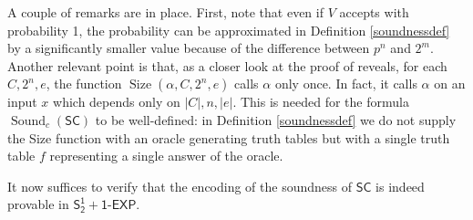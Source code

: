 \documentclass[11pt]{article}
\newcommand{\SOTEXP}{\mathsf{S^1_2} + \mathsf{1\textsf{-}EXP}}
\renewcommand{\SC}{\mathsf{SC}}
\newcommand{\sound}{\operatorname{Sound}}
\newcommand{\setsize}{\operatorname{Size}}
\theoremstyle{definition}
\theoremstyle{plain}
\theoremstyle{remark}
\begin{document}
A couple of remarks are in place. First, note that even if $V$ accepts with probability 1, the probability can be approximated in Definition \ref{soundnessdef} by a significantly smaller value because of the difference between $p^n$ and $2^m$. Another relevant point is that, as a closer look at the proof of  reveals, for each $C,2^n,e$, the function $\setsize(\alpha,C,2^n,e)$ calls $\alpha$ only once. In fact, it calls $\alpha$ on an input $x$ which depends only on $|C|,n,|e|$. This is needed for the formula $\sound_c(\SC)$ to be well-defined: in Definition \ref{soundnessdef} we do not supply the Size function with an oracle generating truth tables but with a single truth table $f$ representing a single answer of the oracle.

It now suffices to verify that the encoding of the soundness of $\SC$ is indeed provable in $\SOTEXP$.
\end{document}
